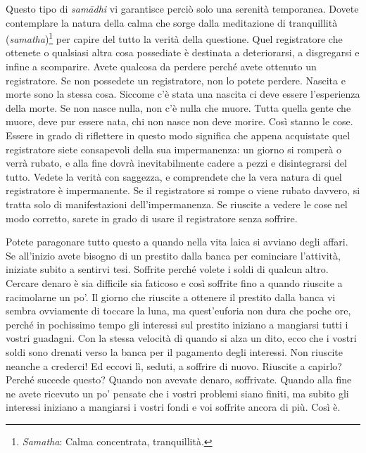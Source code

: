 Questo tipo di \emph{samādhi} vi garantisce perciò solo una serenità
temporanea. Dovete contemplare la natura della calma che sorge dalla
meditazione di tranquillità (\emph{samatha})\footnote{\emph{Samatha}:
  Calma concentrata, tranquillità.} per capire del tutto la verità della
questione. Quel registratore che ottenete o qualsiasi altra cosa
possediate è destinata a deteriorarsi, a disgregarsi e infine a
scomparire. Avete qualcosa da perdere perché avete ottenuto un
registratore. Se non possedete un registratore, non lo potete perdere.
Nascita e morte sono la stessa cosa. Siccome c'è stata una nascita ci
deve essere l'esperienza della morte. Se non nasce nulla, non c'è nulla
che muore. Tutta quella gente che muore, deve pur essere nata, chi non
nasce non deve morire. Così stanno le cose. Essere in grado di
riflettere in questo modo significa che appena acquistate quel
registratore siete consapevoli della sua impermanenza: un giorno si
romperà o verrà rubato, e alla fine dovrà inevitabilmente cadere a pezzi
e disintegrarsi del tutto. Vedete la verità con saggezza, e comprendete
che la vera natura di quel registratore è impermanente. Se il
registratore si rompe o viene rubato davvero, si tratta solo di
manifestazioni dell'impermanenza. Se riuscite a vedere le cose nel modo
corretto, sarete in grado di usare il registratore senza soffrire.

Potete paragonare tutto questo a quando nella vita laica si avviano
degli affari. Se all'inizio avete bisogno di un prestito dalla banca per
cominciare l'attività, iniziate subito a sentirvi tesi. Soffrite perché
volete i soldi di qualcun altro. Cercare denaro è sia difficile sia
faticoso e così soffrite fino a quando riuscite a racimolarne un po'. Il
giorno che riuscite a ottenere il prestito dalla banca vi sembra
ovviamente di toccare la luna, ma quest'euforia non dura che poche ore,
perché in pochissimo tempo gli interessi sul prestito iniziano a
mangiarsi tutti i vostri guadagni. Con la stessa velocità di quando si
alza un dito, ecco che i vostri soldi sono drenati verso la banca per il
pagamento degli interessi. Non riuscite neanche a crederci! Ed eccovi
lì, seduti, a soffrire di nuovo. Riuscite a capirlo? Perché succede
questo? Quando non avevate denaro, soffrivate. Quando alla fine ne avete
ricevuto un po' pensate che i vostri problemi siano finiti, ma subito
gli interessi iniziano a mangiarsi i vostri fondi e voi soffrite ancora
di più. Così è.

